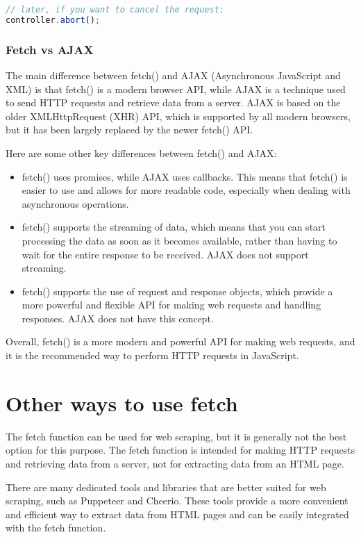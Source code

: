 {\begin{lstlisting}[language=Javascript, caption=AbortController example]
// later, if you want to cancel the request:
controller.abort();

\end{lstlisting}

\subsubsection{Fetch vs AJAX}
The main difference between fetch() and AJAX (Asynchronous JavaScript and XML) is that fetch() is a modern browser API, while AJAX is a technique used to send HTTP requests and retrieve data from a server. AJAX is based on the older XMLHttpRequest (XHR) API, which is supported by all modern browsers, but it has been largely replaced by the newer fetch() API.

Here are some other key differences between fetch() and AJAX:
\begin{itemize}
\item fetch() uses promises, while AJAX uses callbacks. This means that fetch() is easier to use and allows for more readable code, especially when dealing with asynchronous operations.
\item fetch() supports the streaming of data, which means that you can start processing the data as soon as it becomes available, rather than having to wait for the entire response to be received. AJAX does not support streaming.
\item fetch() supports the use of request and response objects, which provide a more powerful and flexible API for making web requests and handling responses. AJAX does not have this concept.
\end{itemize}
Overall, fetch() is a more modern and powerful API for making web requests, and it is the recommended way to perform HTTP requests in JavaScript.


\section{Other ways to use fetch}

The fetch function can be used for web scraping, but it is generally not the best option for this purpose. The fetch function is intended for making HTTP requests and retrieving data from a server, not for extracting data from an HTML page.

There are many dedicated tools and libraries that are better suited for web scraping, such as Puppeteer and Cheerio. These tools provide a more convenient and efficient way to extract data from HTML pages and can be easily integrated with the fetch function.

}
